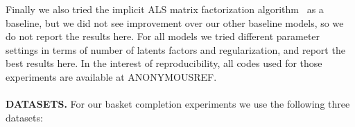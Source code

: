 Finally we also tried the implicit ALS matrix
factorization algorithm~\cite{Hu:2008:CFI:1510528.1511352} as a baseline, but we
did not see improvement over our other baseline models, so we do not report the
results here. For all models we tried different parameter settings in terms of
number of latents factors and regularization, and report the best results here.
In the interest of reproducibility, all codes used for those experiments are available at
ANONYMOUSREF.
\\
\\
\noindent
\textbf{DATASETS.} For our basket completion experiments we use the following three datasets:

